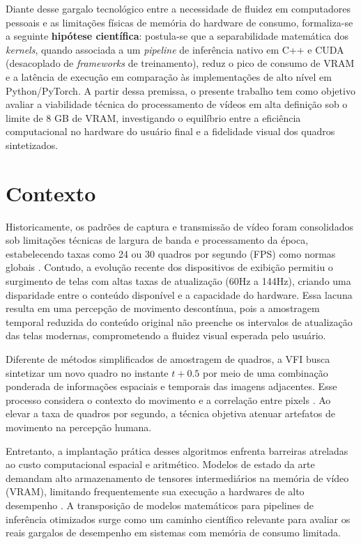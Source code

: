\documentclass[
    12pt,                %
    openright,           %
    oneside,             %
    a4paper,             %
    english,             %
    brazil               %
]{abntex2}
\begin{document}
Diante desse gargalo tecnológico entre a necessidade de fluidez em computadores pessoais e as limitações físicas de memória do hardware de consumo, formaliza-se a seguinte \textbf{hipótese científica}: postula-se que a separabilidade matemática dos \textit{kernels}, quando associada a um \textit{pipeline} de inferência nativo em C++ e CUDA (desacoplado de \textit{frameworks} de treinamento), reduz o pico de consumo de VRAM e a latência de execução em comparação às implementações de alto nível em Python/PyTorch. A partir dessa premissa, o presente trabalho tem como objetivo avaliar a viabilidade técnica do processamento de vídeos em alta definição sob o limite de 8 GB de VRAM, investigando o equilíbrio entre a eficiência computacional no hardware do usuário final e a fidelidade visual dos quadros sintetizados.

\section{Contexto}
\label{sec:contexto}

Historicamente, os padrões de captura e transmissão de vídeo foram consolidados sob limitações técnicas de largura de banda e processamento da época, estabelecendo taxas como 24 ou 30 quadros por segundo (FPS) como normas globais \cite{Gonzalez2009}. Contudo, a evolução recente dos dispositivos de exibição permitiu o surgimento de telas com altas taxas de atualização (60Hz a 144Hz), criando uma disparidade entre o conteúdo disponível e a capacidade do hardware. Essa lacuna resulta em uma percepção de movimento descontínua, pois a amostragem temporal reduzida do conteúdo original não preenche os intervalos de atualização das telas modernas, comprometendo a fluidez visual esperada pelo usuário.

Diferente de métodos simplificados de amostragem de quadros, a VFI busca sintetizar um novo quadro no instante $t+0.5$ por meio de uma combinação ponderada de informações espaciais e temporais das imagens adjacentes. Esse processo considera o contexto do movimento e a correlação entre pixels \cite{Niklaus2017}. Ao elevar a taxa de quadros por segundo, a técnica objetiva atenuar artefatos de movimento na percepção humana.

Entretanto, a implantação prática desses algoritmos enfrenta barreiras atreladas ao custo computacional espacial e aritmético. Modelos de estado da arte demandam alto armazenamento de tensores intermediários na memória de vídeo (VRAM), limitando frequentemente sua execução a hardwares de alto desempenho \cite{Bao2019}. A transposição de modelos matemáticos para pipelines de inferência otimizados surge como um caminho científico relevante para avaliar os reais gargalos de desempenho em sistemas com memória de consumo limitada.
\end{document}
